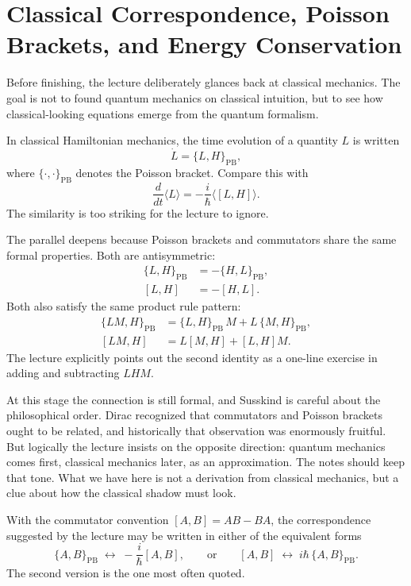 \section{Classical Correspondence, Poisson Brackets, and Energy Conservation}

Before finishing, the lecture deliberately glances back at classical mechanics. The goal is not to found quantum mechanics on classical intuition, but to see how classical-looking equations emerge from the quantum formalism.

In classical Hamiltonian mechanics, the time evolution of a quantity \(L\) is written
\begin{equation}
\dot L=\{L,H\}_{\mathrm{PB}},
\end{equation}
where \(\{\cdot,\cdot\}_{\mathrm{PB}}\) denotes the Poisson bracket. Compare this with
\begin{equation}
\frac{d}{dt}\langle L\rangle=-\frac{i}{\hbar}\langle [L,H]\rangle.
\end{equation}
The similarity is too striking for the lecture to ignore.

The parallel deepens because Poisson brackets and commutators share the same formal properties. Both are antisymmetric:
\begin{align}
\{L,H\}_{\mathrm{PB}}&=-\{H,L\}_{\mathrm{PB}},\\
[L,H]&=-[H,L].
\end{align}
Both also satisfy the same product rule pattern:
\begin{align}
\{LM,H\}_{\mathrm{PB}}&=\{L,H\}_{\mathrm{PB}}\,M+L\,\{M,H\}_{\mathrm{PB}},\\
[LM,H]&=L[M,H]+[L,H]M.
\end{align}
The lecture explicitly points out the second identity as a one-line exercise in adding and subtracting \(LHM\).

At this stage the connection is still formal, and Susskind is careful about the philosophical order. Dirac recognized that commutators and Poisson brackets ought to be related, and historically that observation was enormously fruitful. But logically the lecture insists on the opposite direction: quantum mechanics comes first, classical mechanics later, as an approximation. The notes should keep that tone. What we have here is not a derivation from classical mechanics, but a clue about how the classical shadow must look.

With the commutator convention \([A,B]=AB-BA\), the correspondence suggested by the lecture may be written in either of the equivalent forms
\begin{equation}
\{A,B\}_{\mathrm{PB}}
\;\longleftrightarrow\;
-\frac{i}{\hbar}[A,B],
\qquad\text{or}\qquad
[A,B]
\;\longleftrightarrow\;
i\hbar\,\{A,B\}_{\mathrm{PB}}.
\end{equation}
The second version is the one most often quoted.

